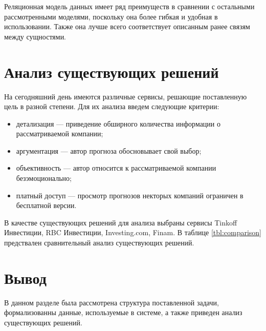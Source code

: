 Реляционная модель данных имеет ряд преимуществ в сравнении с остальными рассмотренными моделями, поскольку она более гибкая и удобная в использовании. Также она лучше всего соответствует описанным ранее связям между сущностями.



\section{Анализ существующих решений}
На сегодняшний день имеются различные сервисы, решающие поставленную цель в разной степени. Для их анализа введем следующие критерии: 
\begin{itemize}
	\item детализация --- приведение обширного количества информации о рассматриваемой компании;
 	\item аргументация --- автор прогноза обосновывает свой выбор;
  	\item объективность --- автор относится к рассматриваемой компании безэмоционально;
   	\item платный доступ --- просмотр прогнозов некторых компаний ограничен в бесплатной версии.
\end{itemize}
В качестве существующих решений для анализа выбраны сервисы Tinkoff Инвестиции, RBC Инвестиции, Investing.com, Finam.
В таблице \ref*{tbl:comparison} предствален сравнительный анализ существующих решений.

\begin{table}[H]
	\centering
	\caption{Анализ существующих решений}
	\label{tbl:comparison}
\end{table}


\section{Вывод}

В данном разделе была рассмотрена структура поставленной задачи, формализованны данные, используемые в системе, а также приведен анализ существующих решений.
